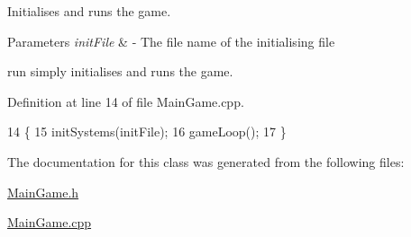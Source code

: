 Initialises and runs the game. 


\begin{DoxyParams}{Parameters}
{\em init\+File} & -\/ The file name of the initialising file\\
\hline
\end{DoxyParams}
run simply initialises and runs the game. 

Definition at line 14 of file Main\+Game.\+cpp.


\begin{DoxyCode}
14                                  \{
15     initSystems(initFile);
16     gameLoop();
17 \}
\end{DoxyCode}


The documentation for this class was generated from the following files\+:\begin{DoxyCompactItemize}
\item 
\hyperlink{_main_game_8h}{Main\+Game.\+h}\item 
\hyperlink{_main_game_8cpp}{Main\+Game.\+cpp}\end{DoxyCompactItemize}
